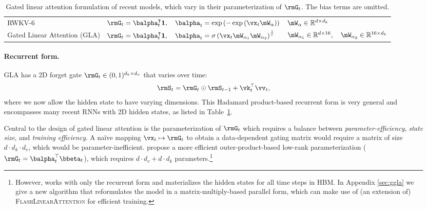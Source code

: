 \begin{table*}[t!]
{\begin{tabular}{l l l }
  \\
  RWKV-6 \cite{peng2024eagle} & $\rmG_t =\balpha_t^\intercal\mathbf{1}, \quad \balpha_t = \exp\left(-\exp\left(\vx_t\mW_{\alpha}\right)\right)$ & $\mW_{\alpha} \in \mathbb{R}^{d \times d_k} $ \\
  Gated Linear Attention (GLA) & $\rmG_t = \balpha_t^\intercal \mathbf{1}, \quad \balpha_t = \sigma\left(\vx_t\mW_{\alpha_1}\mW_{\alpha_2}\right)^{\frac{1}{\tau}}$ & $\mW_{\alpha_1} \in \mathbb{R}^{d\times 16}, \quad \mW_{\alpha_2}\in \mathbb{R}^{16 \times d_k}$ \\
  \bottomrule
\end{tabular}
}
\vspace{1mm}
\vspace{-4mm}
\caption{Gated linear attention formulation of recent  models, which vary in their parameterization of $\rmG_t$. The bias terms are omitted.}
\vspace{-4mm}
\label{tab:G_param}
\end{table*}
\paragraph{Recurrent form.} GLA has a 2D forget gate \(\rmG_t \in (0,1)^{d_k \times d_v}\) that varies over time:
\[
\rmS_t = \rmG_t \odot \rmS_{t-1} + \vk_t^{\top} \vv_t,
\]
where we now allow the hidden state to have varying dimensions.
This Hadamard product-based  recurrent form is very general and encompasses many recent RNNs with 2D hidden states, as listed in Table~\ref{tab:G_param}. 

Central to the design of gated linear attention  is the parameterization of \(\rmG_t\) which requires a balance between \textit{parameter-efficiency}, \textit{state size}, 
and \textit{training efficiency}.
A na\"{i}ve mapping $\vx_t \mapsto \rmG_{t}$ to obtain a data-dependent gating matrix would require a matrix of size $d \cdot d_k \cdot d_v$, which would be parameter-inefficient. \citet{mao-2022-fine} propose a more efficient outer-product-based low-rank parameterization (\(\rmG_t = \balpha_t^{\top} \bbeta_t\)), which requires $d \cdot d_v + d  \cdot d_k$ parameters.\footnote{However, \citet{mao-2022-fine} works with only the recurrent form and materializes the hidden states for all time steps in HBM. In Appendix \ref{sec:ggla} we give a new algorithm that reformulates the model in a matrix-multiply-based parallel form, which can make use of (an extension of) \textsc{FlashLinearAttention} for efficient training.}

